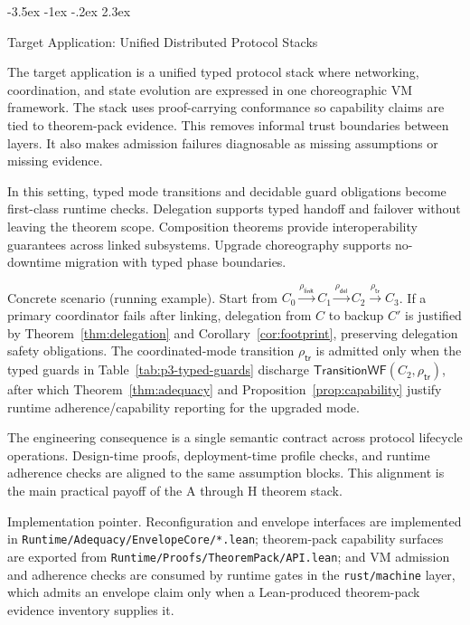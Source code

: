 \documentclass[a4paper,10pt,twocolumn,english]{article}
\makeatletter
\renewcommand{\section}{\@startsection{section}{1}{\z@}%
  {-3.5ex \@plus -1ex \@minus -.2ex}%
  {2.3ex}%
  {\raggedright\normalfont\large\bfseries}}
\numberwithin{equation}{section}
\theoremstyle{paperdef}
\theoremstyle{paperplain}
\theoremstyle{paperdef}
\theoremstyle{paperremark}
\theoremstyle{paperdef}
\makeatother
\begin{document}
\section{Target Application: Unified Distributed Protocol Stacks}
\label{sec:application}

The target application is a unified typed protocol stack where networking, coordination, and state evolution are expressed in one choreographic VM framework. The stack uses proof-carrying conformance so capability claims are tied to theorem-pack evidence. This removes informal trust boundaries between layers. It also makes admission failures diagnosable as missing assumptions or missing evidence.

In this setting, typed mode transitions and decidable guard obligations become first-class runtime checks. Delegation supports typed handoff and failover without leaving the theorem scope. Composition theorems provide interoperability guarantees across linked subsystems. Upgrade choreography supports no-downtime migration with typed phase boundaries.

Concrete scenario (running example). Start from
$C_0 \xrightarrow{\rho_{\mathsf{link}}} C_1 \xrightarrow{\rho_{\mathsf{del}}}
	C_2 \xrightarrow{\rho_{\mathsf{tr}}} C_3$. If a primary coordinator fails after
linking, delegation from $C$ to backup $C'$ is justified by
Theorem~\ref{thm:delegation} and Corollary~\ref{cor:footprint}, preserving
delegation safety obligations. The coordinated-mode transition
$\rho_{\mathsf{tr}}$ is admitted only when the typed guards in
Table~\ref{tab:p3-typed-guards} discharge
$\mathsf{TransitionWF}(C_2,\rho_{\mathsf{tr}})$, after which
Theorem~\ref{thm:adequacy} and Proposition~\ref{prop:capability} justify runtime
adherence/capability reporting for the upgraded mode.

The engineering consequence is a single semantic contract across protocol lifecycle operations. Design-time proofs, deployment-time profile checks, and runtime adherence checks are aligned to the same assumption blocks. This alignment is the main practical payoff of the A through H theorem stack.

Implementation pointer. Reconfiguration and envelope interfaces are implemented
in \texttt{Runtime/Adequacy/EnvelopeCore/*.lean}; theorem-pack capability
surfaces are exported from \texttt{Runtime/Proofs/TheoremPack/API.lean}; and VM
admission and adherence checks are consumed by runtime gates in the
\texttt{rust/machine} layer, which admits an envelope claim only when a
Lean-produced theorem-pack evidence inventory supplies it.
\end{document}
